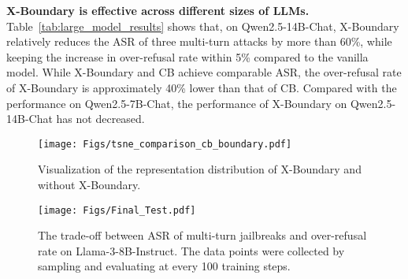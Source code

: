 \textbf{X-Boundary is effective across different sizes of LLMs.}
%
Table~\ref{tab:large_model_results} shows that, on Qwen2.5-14B-Chat, X-Boundary relatively reduces the ASR of three multi-turn attacks by more than 60\%, while keeping the increase in over-refusal rate within 5\% compared to the vanilla model.
%
While X-Boundary and CB achieve comparable ASR, the over-refusal rate of X-Boundary is approximately 40\% lower than that of CB.
%
Compared with the performance on Qwen2.5-7B-Chat, the performance of X-Boundary on Qwen2.5-14B-Chat has not decreased.
%
\begin{figure}[t]
\begin{center}
\centerline{\texttt{[image: Figs/tsne\_comparison\_cb\_boundary.pdf]}}
\setlength{\abovecaptionskip}{0.1in} 
\caption{Visualization of the representation distribution of X-Boundary and without X-Boundary.} 
\label{figs:t-sne}
\end{center}
\vskip -0.45in
\end{figure}
%
\renewcommand{\thesubfigure}{}
\begin{figure}[t]
\begin{center}
\centerline{\texttt{[image: Figs/Final\_Test.pdf]}}
\setlength{\abovecaptionskip}{0.1in} 
\caption{The trade-off between ASR of multi-turn jailbreaks and over-refusal rate on Llama-3-8B-Instruct. The data points were collected by sampling and evaluating at every 100 training steps.}
\label{fig:trade_off}
\end{center}
\vskip -0.4in
\end{figure}
%
